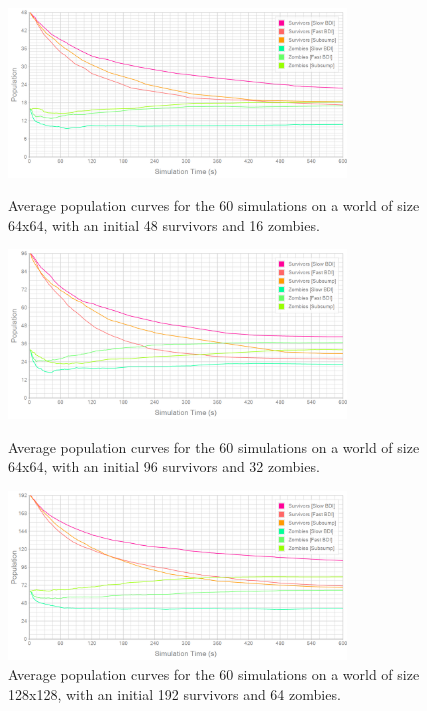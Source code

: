 \documentclass[12pt,a4paper]{article}
\begin{document}
\begin{figure}
\vspace{-20mm}
\centering
\includegraphics[width=0.8\textwidth]{../../Results/64_48_16/population}
\caption{\small Average population curves for the 60 simulations on a world of size 64x64, with an initial 48 survivors and 16 zombies.}

\vspace{5mm}
\includegraphics[width=0.8\textwidth]{../../Results/64_96_32/population}
\caption{\small Average population curves for the 60 simulations on a world of size 64x64, with an initial 96 survivors and 32 zombies.}

\vspace{5mm}
\includegraphics[width=0.8\textwidth]{../../Results/128_192_64/population}
\caption{\small Average population curves for the 60 simulations on a world of size 128x128, with an initial 192 survivors and 64 zombies.}
\end{figure}
\end{document}
